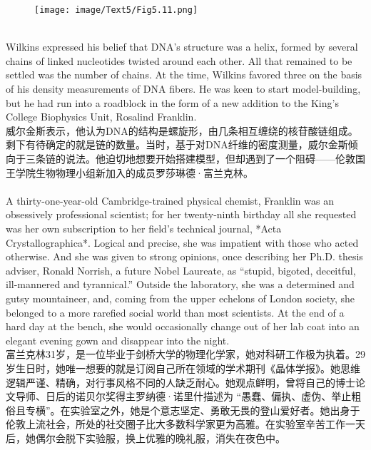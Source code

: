 \documentclass{article}
\begin{document}
\begin{figure}
    \centering
    \texttt{[image: image/Text5/Fig5.11.png]}
\end{figure}

\\
Wilkins expressed his belief that DNA’s structure was a helix, formed by several chains of linked nucleotides twisted around each other. All that remained to be settled was the number of chains. At the time, Wilkins favored three on the basis of his density measurements of DNA fibers. He was keen to start model-building, but he had run into a roadblock in the form of a new addition to the King’s College Biophysics Unit, Rosalind Franklin.\\
威尔金斯表示，他认为DNA的结构是螺旋形，由几条相互缠绕的核苷酸链组成。剩下有待确定的就是链的数量。当时，基于对DNA纤维的密度测量，威尔金斯倾向于三条链的说法。他迫切地想要开始搭建模型，但却遇到了一个阻碍——伦敦国王学院生物物理小组新加入的成员罗莎琳德·富兰克林。\\

\\
A thirty-one-year-old Cambridge-trained physical chemist, Franklin was an obsessively professional scientist; for her twenty-ninth birthday all she requested was her own subscription to her field’s technical journal, *Acta Crystallographica*. Logical and precise, she was impatient with those who acted otherwise. And she was given to strong opinions, once describing her Ph.D. thesis adviser, Ronald Norrish, a future Nobel Laureate, as “stupid, bigoted, deceitful, ill-mannered and tyrannical.” Outside the laboratory, she was a determined and gutsy mountaineer, and, coming from the upper echelons of London society, she belonged to a more rarefied social world than most scientists. At the end of a hard day at the bench, she would occasionally change out of her lab coat into an elegant evening gown and disappear into the night.\\
富兰克林31岁，是一位毕业于剑桥大学的物理化学家，她对科研工作极为执着。29岁生日时，她唯一想要的就是订阅自己所在领域的学术期刊《晶体学报》。她思维逻辑严谨、精确，对行事风格不同的人缺乏耐心。她观点鲜明，曾将自己的博士论文导师、日后的诺贝尔奖得主罗纳德·诺里什描述为 “愚蠢、偏执、虚伪、举止粗俗且专横”。在实验室之外，她是个意志坚定、勇敢无畏的登山爱好者。她出身于伦敦上流社会，所处的社交圈子比大多数科学家更为高雅。在实验室辛苦工作一天后，她偶尔会脱下实验服，换上优雅的晚礼服，消失在夜色中。\\
\end{document}
